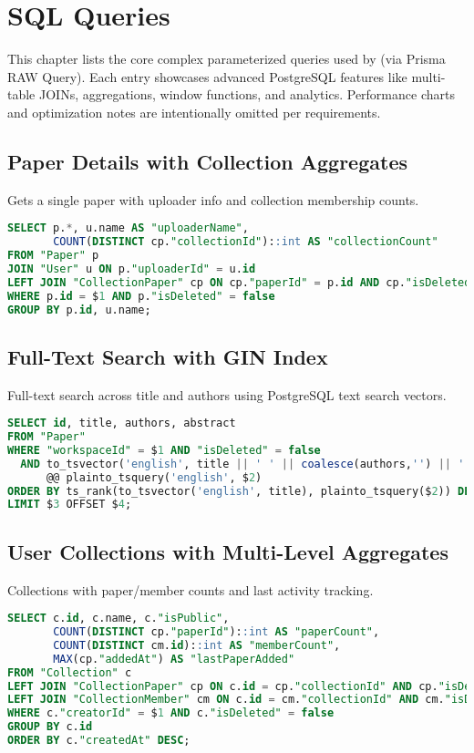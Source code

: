 \chapter{SQL Queries}
\label{ch:sql-queries}

This chapter lists the core complex parameterized queries used by \projectname{} (via Prisma RAW Query). Each entry showcases advanced PostgreSQL features like multi-table JOINs, aggregations, window functions, and analytics. Performance charts and optimization notes are intentionally omitted per requirements.

\section{Paper Details with Collection Aggregates}
Gets a single paper with uploader info and collection membership counts.
\begin{lstlisting}[language=SQL]
SELECT p.*, u.name AS "uploaderName",
       COUNT(DISTINCT cp."collectionId")::int AS "collectionCount"
FROM "Paper" p
JOIN "User" u ON p."uploaderId" = u.id
LEFT JOIN "CollectionPaper" cp ON cp."paperId" = p.id AND cp."isDeleted" = false
WHERE p.id = $1 AND p."isDeleted" = false
GROUP BY p.id, u.name;
\end{lstlisting}

\section{Full-Text Search with GIN Index}
Full-text search across title and authors using PostgreSQL text search vectors.
\begin{lstlisting}[language=SQL]
SELECT id, title, authors, abstract
FROM "Paper"
WHERE "workspaceId" = $1 AND "isDeleted" = false
  AND to_tsvector('english', title || ' ' || coalesce(authors,'') || ' ' || coalesce(abstract,''))
      @@ plainto_tsquery('english', $2)
ORDER BY ts_rank(to_tsvector('english', title), plainto_tsquery($2)) DESC
LIMIT $3 OFFSET $4;
\end{lstlisting}

\section{User Collections with Multi-Level Aggregates}
Collections with paper/member counts and last activity tracking.
\begin{lstlisting}[language=SQL]
SELECT c.id, c.name, c."isPublic",
       COUNT(DISTINCT cp."paperId")::int AS "paperCount",
       COUNT(DISTINCT cm.id)::int AS "memberCount",
       MAX(cp."addedAt") AS "lastPaperAdded"
FROM "Collection" c
LEFT JOIN "CollectionPaper" cp ON c.id = cp."collectionId" AND cp."isDeleted" = false
LEFT JOIN "CollectionMember" cm ON c.id = cm."collectionId" AND cm."isDeleted" = false
WHERE c."creatorId" = $1 AND c."isDeleted" = false
GROUP BY c.id
ORDER BY c."createdAt" DESC;
\end{lstlisting}

